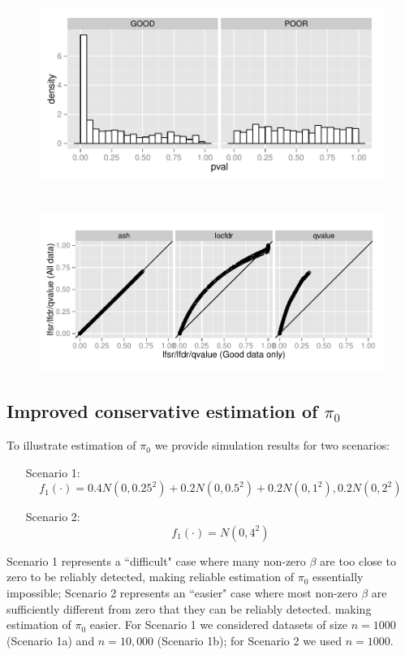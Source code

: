 \documentclass[11pt]{article}
\begin{document}
\begin{figure}[!ht] \label{fig:good_poor_hist}
\begin{center}
\includegraphics[height=3in]{Rcode/figures/good_poor_hist.pdf}
\includegraphics[width=6.5in]{Rcode/figures/good_vs_all.pdf}
\end{center}
\caption{}
\end{figure}


\subsection*{Improved conservative estimation of $\pi_0$}

To illustrate estimation of $\pi_0$ we provide simulation results for two scenarios:
\begin{enumerate}
\item[Scenario 1:]
\begin{equation}
f_1(\cdot) =  0.4 N(0,0.25^2) + 0.2 N(0,0.5^2) + 0.2 N(0,1^2), 0.2 N(0,2^2)
\end{equation}
\item[Scenario 2:]
\begin{equation}
f_1(\cdot) = N(0,4^2)
\end{equation}
\end{enumerate}
Scenario 1 represents a ``difficult" case where many non-zero $\beta$ are
too close to  zero to be reliably detected, making reliable estimation of $\pi_0$ essentially impossible; 
Scenario 2 represents an ``easier" case where most non-zero $\beta$ are
sufficiently different from zero that they can be reliably detected. making estimation of $\pi_0$ easier.
For Scenario 1 we considered datasets of size $n=1000$ (Scenario 1a) and $n=10,000$ (Scenario 1b);
for Scenario 2 we used $n=1000$.
\end{document}
